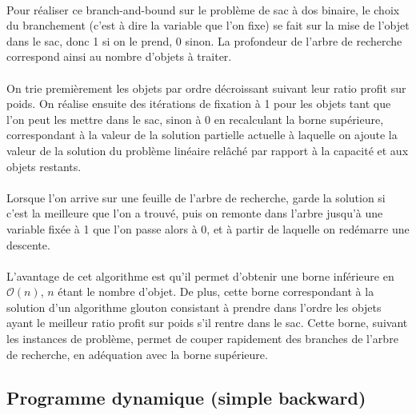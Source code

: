 \documentclass[12pt]{article}
\begin{document}
\paragraph{}Pour réaliser ce branch-and-bound sur le problème de sac à dos binaire, le choix du branchement (c'est à dire la variable que l'on fixe) se fait sur la mise de l'objet dans le sac, donc 1 si on le prend, 0 sinon. La profondeur de l'arbre de recherche correspond ainsi au nombre d'objets à traiter.

\paragraph{}On trie premièrement les objets par ordre décroissant suivant leur ratio profit sur poids. On réalise ensuite des itérations de fixation à 1 pour les objets tant que l'on peut les mettre dans le sac, sinon à 0 en recalculant la borne supérieure, correspondant à la valeur de la solution partielle actuelle à laquelle on ajoute la valeur de la solution du problème linéaire relâché par rapport à la capacité et aux objets restants.

\paragraph{}Lorsque l'on arrive sur une feuille de l'arbre de recherche, garde la solution si c'est la meilleure que l'on a trouvé, puis on remonte dans l'arbre jusqu'à une variable fixée à 1 que l'on passe alors à 0, et à partir de laquelle on redémarre une descente.

\paragraph{}L'avantage de cet algorithme est qu'il permet d'obtenir une borne inférieure en $\mathcal{O}(n)$, $n$ étant le nombre d'objet. De plus, cette borne correspondant à la solution d'un algorithme glouton consistant à prendre dans l'ordre les objets ayant le meilleur ratio profit sur poids s'il rentre dans le sac. Cette borne, suivant les instances de problème, permet de couper rapidement des branches de l'arbre de recherche, en adéquation avec la borne supérieure.

\subsection{Programme dynamique (simple backward)}

\paragraph{}
\end{document}
